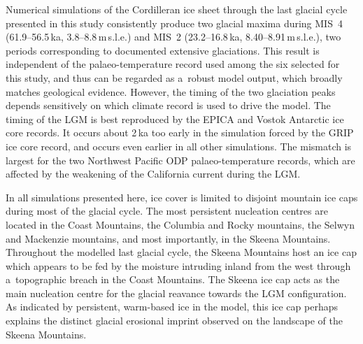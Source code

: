\documentclass[tc, manuscript]{copernicus}
\begin{document}
\conclusions
\label{sec:concl}

      Numerical simulations of the Cordilleran ice sheet through the last
      glacial cycle presented in this study consistently produce two glacial
      maxima during MIS~4 (61.9--56.5\,\unit{ka},
      3.8--8.8\,\unit{m}\,s.l.e.) and MIS~2 (23.2--16.8\,\unit{ka},
      8.40--8.91\,\unit{m}\,s.l.e.), two periods corresponding to documented
      extensive glaciations. This result is independent of the
      palaeo-temperature record used among the six selected for this study,
      and thus can be regarded as a~robust model output, which broadly
      matches geological evidence. However, the timing of the two glaciation
      peaks depends sensitively on which climate record is used to drive the
      model. The timing of the LGM is best reproduced by the EPICA and
      Vostok Antarctic ice core records. It occurs about 2\,\unit{ka} too
      early in the simulation forced by the GRIP ice core record, and occurs
      even earlier in all other simulations. The mismatch is largest for the
      two Northwest Pacific ODP palaeo-temperature records, which are
      affected by the weakening of the California current during the LGM.

      In all simulations presented here, ice cover is limited to disjoint
      mountain ice caps during most of the glacial cycle. The most
      persistent nucleation centres are located in the Coast Mountains, the
      Columbia and Rocky mountains, the Selwyn and Mackenzie mountains, and
      most importantly, in the Skeena Mountains. Throughout the modelled
      last glacial cycle, the Skeena Mountains host an ice cap which appears
      to be fed by the moisture intruding inland from the west through
      a~topographic breach in the Coast Mountains. The Skeena ice cap acts as
      the main nucleation centre for the glacial reavance towards the LGM
      configuration. As indicated by persistent, warm-based ice in the
      model, this ice cap perhaps explains the distinct glacial erosional
      imprint observed on the landscape of the Skeena Mountains.
\end{document}
